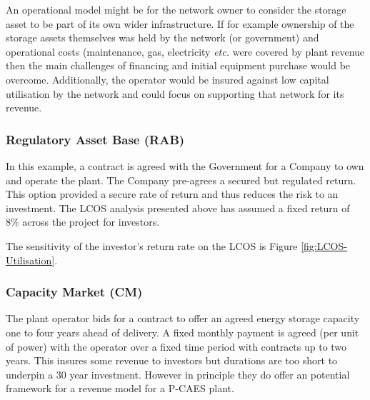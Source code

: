 \documentclass[preprint,12pt]{elsarticle}
\begin{document}
An operational model might be for the network owner to consider the storage asset to be part of its own wider infrastructure. If for example ownership of the storage assets themselves was held by the network (or government) and operational costs (maintenance, gas, electricity \textit{etc.} were covered by plant revenue then the main challenges of financing and initial equipment purchase would be overcome. Additionally, the operator would be insured against low capital utilisation by the network and could focus on supporting that network for its revenue. 









\subsubsection{Regulatory Asset Base (RAB)} 
In this example, a contract is agreed with the Government for a Company to own and operate the plant. The Company pre-agrees a secured but regulated return. This option provided a secure rate of return and thus reduces the risk to an investment. The LCOS analysis presented above has assumed a fixed return of 8\% across the project for investors.

The sensitivity of the investor's return rate on the LCOS is Figure \ref{fig:LCOS-Utilisation}. 

\subsubsection{Capacity Market (CM)} 
The plant operator bids for a contract to offer an agreed energy storage capacity one to four years ahead of delivery. A fixed monthly payment is agreed (per unit of power) with the operator over a fixed time period with contracts up to two years. This insures some revenue to investors but durations are too short to underpin a 30 year investment. However in principle they do offer an potential framework for a revenue model for a P-CAES plant. 
\end{document}

